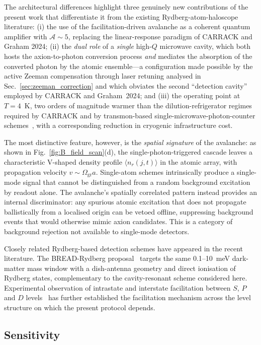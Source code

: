 The architectural differences highlight three genuinely new contributions of the present work that differentiate it from the existing Rydberg-atom-haloscope literature: (i) the use of the facilitation-driven avalanche as a coherent quantum amplifier with $\mathcal{A}\!\sim\!5$, replacing the linear-response paradigm of CARRACK and Graham 2024; (ii) the \emph{dual role} of a \emph{single} high-$Q$ microwave cavity, which both hosts the axion-to-photon conversion process \emph{and} mediates the absorption of the converted photon by the atomic ensemble---a configuration made possible by the active Zeeman compensation through laser retuning analysed in Sec.~\ref{sec:zeeman_correction} and which obviates the second ``detection cavity'' employed by CARRACK and Graham~2024; and (iii) the operating point at $T = 4$~K, two orders of magnitude warmer than the dilution-refrigerator regimes required by CARRACK and by transmon-based single-microwave-photon-counter schemes~\cite{Dixit2025}, with a corresponding reduction in cryogenic infrastructure cost.

The most distinctive feature, however, is the \emph{spatial signature} of the avalanche: as shown in Fig.~\ref{fig:B_field_scan}(d), the single-photon-triggered cascade leaves a characteristic V-shaped density profile $\langle n_r(j,t)\rangle$ in the atomic array, with propagation velocity $v\!\sim\!\Omega_{\mathrm{gr}} a$. Single-atom schemes intrinsically produce a single-mode signal that cannot be distinguished from a random background excitation by readout alone. The avalanche's spatially correlated pattern instead provides an internal discriminator: any spurious atomic excitation that does not propagate ballistically from a localised origin can be vetoed offline, suppressing background events that would otherwise mimic axion candidates. This is a category of background rejection not available to single-mode detectors.

Closely related Rydberg-based detection schemes have appeared in the recent literature. The BREAD-Rydberg proposal~\cite{Banerjee2025} targets the same 0.1--10~meV dark-matter mass window with a dish-antenna geometry and direct ionisation of Rydberg states, complementary to the cavity-resonant scheme considered here. Experimental observation of intrastate and interstate facilitation between $S$, $P$ and $D$ levels~\cite{Pourjafarabadi2026} has further established the facilitation mechanism across the level structure on which the present protocol depends.


\subsection*{Sensitivity}



